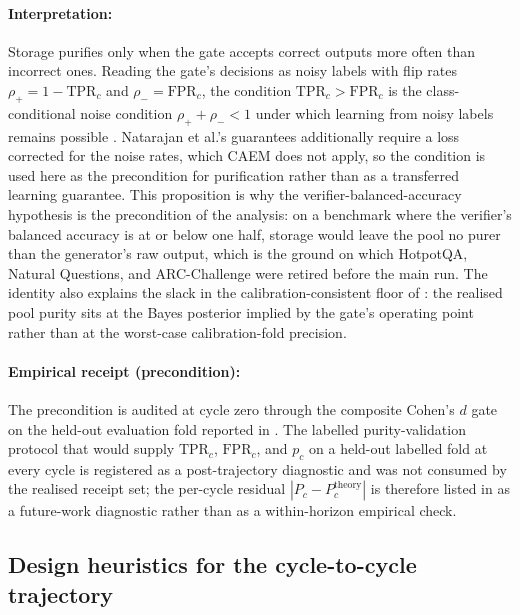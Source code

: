 \paragraph{Interpretation:} Storage purifies only when the gate accepts correct outputs more often than incorrect ones. Reading the gate's decisions as noisy labels with flip rates $\rho_{+} = 1-\mathrm{TPR}_c$ and $\rho_{-} = \mathrm{FPR}_c$, the condition $\mathrm{TPR}_c > \mathrm{FPR}_c$ is the class-conditional noise condition $\rho_{+} + \rho_{-} < 1$ under which learning from noisy labels remains possible \cite{natarajan2013learning}. Natarajan et al.'s guarantees additionally require a loss corrected for the noise rates, which CAEM does not apply, so the condition is used here as the precondition for purification rather than as a transferred learning guarantee. This proposition is why the verifier-balanced-accuracy hypothesis is the precondition of the analysis: on a benchmark where the verifier's balanced accuracy is at or below one half, storage would leave the pool no purer than the generator's raw output, which is the ground on which HotpotQA, Natural Questions, and ARC-Challenge were retired before the main run. The identity also explains the slack in the calibration-consistent floor of : the realised pool purity sits at the Bayes posterior implied by the gate's operating point rather than at the worst-case calibration-fold precision.

\paragraph{Empirical receipt (precondition):} The precondition is audited at cycle zero through the composite Cohen's $d$ gate on the held-out evaluation fold reported in . The labelled purity-validation protocol that would supply $\mathrm{TPR}_c$, $\mathrm{FPR}_c$, and $p_c$ on a held-out labelled fold at every cycle is registered as a post-trajectory diagnostic and was not consumed by the realised receipt set; the per-cycle residual $|P_c - P_c^{\text{theory}}|$ is therefore listed in  as a future-work diagnostic rather than as a within-horizon empirical check.

\subsection{Design heuristics for the cycle-to-cycle trajectory}
\label{sec:theory-heuristics}

